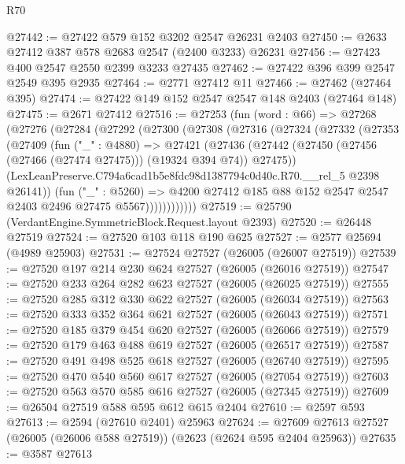 \begin{lexlean}{R70}
\begin{coremodule}
@27442 := @27422 @579 @152 @3202 @2547 @26231 @2403
@27450 := @2633 @27412 @387 @578 @2683 @2547 (@2400 @3233) @26231
@27456 := @27423 @400 @2547 @2550 @2399 @3233 @27435
@27462 := @27422 @396 @399 @2547 @2549 @395 @2935
@27464 := @2771 @27412 @11
@27466 := @27462 (@27464 @395)
@27474 := @27422 @149 @152 @2547 @2547 @148 @2403 (@27464 @148)
@27475 := @2671 @27412
@27516 := @27253
    (fun (word : @66) =>
    @27268
      (@27276
        (@27284
          (@27292
            (@27300
              (@27308
                (@27316
                  (@27324
                    (@27332
                      (@27353
                        (@27409
                          (fun ("_" : @4880) =>
                          @27421
                            (@27436
                              (@27442
                                (@27450 (@27456 (@27466 (@27474 @27475))) (@19324 @394 @74))
                                @27475))
                            (LexLeanPreserve.C794a6cad1b5e8fdc98d1387794c0d40c.R70.__rel_5
                              @2398
                              @26141))
                          (fun ("_" : @5260) =>
                          @4200
                            @27412
                            @185
                            @88
                            @152
                            @2547
                            @2547
                            @2403
                            @2496
                            @27475
                            @5567))))))))))))
@27519 := @25790 (VerdantEngine.SymmetricBlock.Request.layout @2393)
@27520 := @26448 @27519
@27524 := @27520 @103 @118 @190 @625
@27527 := @2577 @25694 (@4989 @25903)
@27531 := @27524 @27527 (@26005 (@26007 @27519))
@27539 := @27520 @197 @214 @230 @624 @27527 (@26005 (@26016 @27519))
@27547 := @27520 @233 @264 @282 @623 @27527 (@26005 (@26025 @27519))
@27555 := @27520 @285 @312 @330 @622 @27527 (@26005 (@26034 @27519))
@27563 := @27520 @333 @352 @364 @621 @27527 (@26005 (@26043 @27519))
@27571 := @27520 @185 @379 @454 @620 @27527 (@26005 (@26066 @27519))
@27579 := @27520 @179 @463 @488 @619 @27527 (@26005 (@26517 @27519))
@27587 := @27520 @491 @498 @525 @618 @27527 (@26005 (@26740 @27519))
@27595 := @27520 @470 @540 @560 @617 @27527 (@26005 (@27054 @27519))
@27603 := @27520 @563 @570 @585 @616 @27527 (@26005 (@27345 @27519))
@27609 := @26504 @27519 @588 @595 @612 @615 @2404
@27610 := @2597 @593
@27613 := @2594 (@27610 @2401) @25963
@27624 := @27609 @27613 @27527 (@26005 (@26006 @588 @27519)) (@2623 (@2624 @595 @2404 @25963))
@27635 := @3587
    @27613

\end{coremodule}
\end{lexlean}
